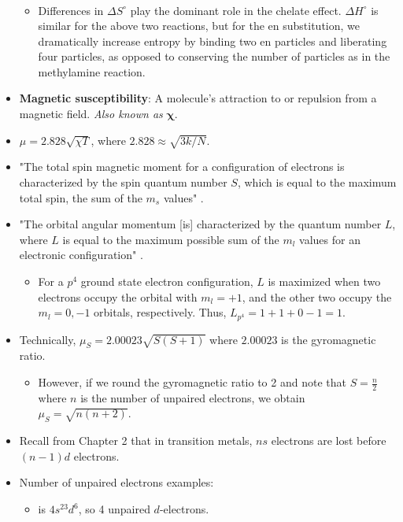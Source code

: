 \documentclass[../notes.tex]{subfiles}
\begin{document}
\begin{itemize}
\begin{gather*}
    \end{gather*}
    \begin{itemize}
        \item Differences in $\Delta S^\circ$ play the dominant role in the chelate effect. $\Delta H^\circ$ is similar for the above two reactions, but for the en substitution, we dramatically increase entropy by binding two en particles and liberating four  particles, as opposed to conserving the number of particles as in the methylamine reaction.
    \end{itemize}
    \item \textbf{Magnetic susceptibility}: A molecule's attraction to or repulsion from a magnetic field. \emph{Also known as} $\bm{\chi}$.
    \item $\mu=2.828\sqrt{\chi T}$, where $2.828\approx\sqrt{3k/N}$.
    \item "The total spin magnetic moment for a configuration of electrons is characterized by the spin quantum number $S$, which is equal to the maximum total spin, the sum of the $m_s$ values" \parencite[360]{bib:MiesslerFischerTarr}.
    \item "The orbital angular momentum [is] characterized by the quantum number $L$, where $L$ is equal to the maximum possible sum of the $m_l$ values for an electronic configuration" \parencite[360]{bib:MiesslerFischerTarr}.
    \begin{itemize}
        \item For a $p^4$ ground state electron configuration, $L$ is maximized when two electrons occupy the orbital with $m_l=+1$, and the other two occupy the $m_l=0,-1$ orbitals, respectively. Thus, $L_{p^4}=1+1+0-1=1$.
    \end{itemize}
    \item Technically, $\mu_S=2.00023\sqrt{S(S+1)}$ where $2.00023$ is the gyromagnetic ratio.
    \begin{itemize}
        \item However, if we round the gyromagnetic ratio to 2 and note that $S=\frac{n}{2}$ where $n$ is the number of unpaired electrons, we obtain $\mu_S=\sqrt{n(n+2)}$.
    \end{itemize}
    \item Recall from Chapter 2 that in transition metals, $ns$ electrons are lost before $(n-1)d$ electrons.
    \item Number of unpaired electrons examples:
    \begin{itemize}
        \item {} is $4s^23d^6$, so 4 unpaired $d$-electrons.

\end{itemize}
\end{itemize}
\end{document}
